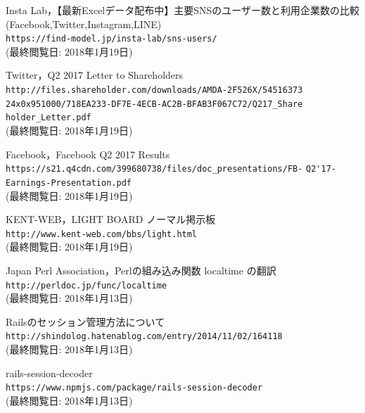 \documentclass[10pt, a4paper]{jreport}
\begin{document}
\begin{thebibliography}{n}

 Insta Lab，【最新Excelデータ配布中】主要SNSのユーザー数と利用企業数の比較(Facebook,Twitter,Instagram,LINE)\\
\verb|https://find-model.jp/insta-lab/sns-users/|\\
(最終閲覧日: 2018年1月19日)

 Twitter，Q2 2017 Letter to Shareholders\\
\verb|http://files.shareholder.com/downloads/AMDA-2F526X/54516373|
\verb|24x0x951000/718EA233-DF7E-4ECB-AC2B-BFAB3F067C72/Q217_Share|
\verb|holder_Letter.pdf|\\
(最終閲覧日: 2018年1月19日)

 Facebook，Facebook Q2 2017 Results\\
\verb|https://s21.q4cdn.com/399680738/files/doc_presentations/FB-|
\verb|Q2'17-Earnings-Presentation.pdf|\\
(最終閲覧日: 2018年1月19日)

 KENT-WEB，LIGHT BOARD ノーマル掲示板\\
\verb|http://www.kent-web.com/bbs/light.html|\\
(最終閲覧日: 2018年1月19日)

 Japan Perl Association，Perlの組み込み関数 localtime の翻訳\\
\verb|http://perldoc.jp/func/localtime|\\
(最終閲覧日: 2018年1月13日)

 Railsのセッション管理方法について\\
\verb|http://shindolog.hatenablog.com/entry/2014/11/02/164118|\\
(最終閲覧日: 2018年1月13日)

 rails-session-decoder\\
\verb|https://www.npmjs.com/package/rails-session-decoder|\\
(最終閲覧日: 2018年1月13日)


\end{thebibliography}
\end{document}
